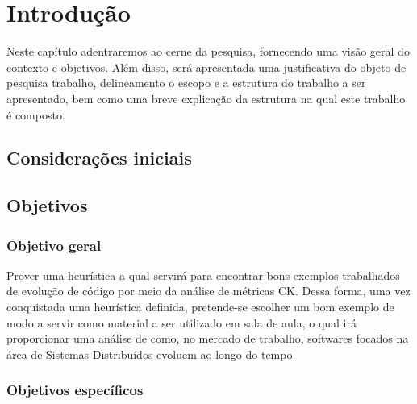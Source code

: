 
\chapter{Introdução}\label{cap:introducao}

Neste capítulo adentraremos ao cerne da pesquisa, fornecendo uma visão geral do contexto e objetivos. Além disso, será apresentada uma justificativa do objeto de pesquisa trabalho, delineamento o escopo e a estrutura do trabalho a ser apresentado, bem como uma breve explicação da estrutura na qual este trabalho é composto. 

\section{Considerações iniciais}\label{sec:consideracoesIniciais}

\section{Objetivos}\label{sec:objetivos}

\subsection{Objetivo geral}\label{subsec:objetivoGeral}

Prover uma heurística a qual servirá para encontrar bons exemplos trabalhados de evolução de código por meio da análise de métricas CK. Dessa forma, uma vez conquistada uma heurística definida, pretende-se escolher um bom exemplo de modo a servir como material a ser utilizado em sala de aula, o qual irá proporcionar uma análise de como, no mercado de trabalho, softwares focados na área de Sistemas Distribuídos evoluem ao longo do tempo.

\subsection{Objetivos específicos}\label{subsec:objetivosEspecificos}

